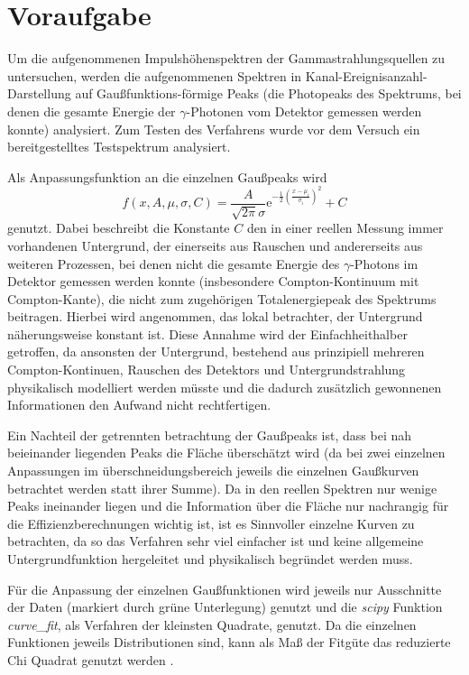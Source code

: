 \chapter{Voraufgabe}
Um die aufgenommenen Impulshöhenspektren der Gammastrahlungsquellen zu untersuchen, werden die aufgenommenen Spektren in Kanal-Ereignisanzahl-Darstellung auf Gaußfunktions-förmige Peaks (die Photopeaks des Spektrums, bei denen die gesamte Energie der $\gamma$-Photonen vom Detektor gemessen werden konnte) analysiert. Zum Testen des Verfahrens wurde vor dem Versuch ein bereitgestelltes Testspektrum analysiert.


Als Anpassungsfunktion an die einzelnen Gaußpeaks wird
\begin{equation}\label{eq:gaußpeak_const}
f(x,A,\mu,\sigma,C) = \frac{A}{\sqrt{2\pi}\sigma} \text{e}^{-\frac{1}{2}(\frac{x-\mu_i}{\sigma_i})^2}+C
\end{equation}
genutzt. Dabei beschreibt die Konstante $C$ den in einer reellen Messung immer vorhandenen Untergrund, der einerseits aus Rauschen und andererseits aus weiteren Prozessen, bei denen nicht die gesamte Energie des $\gamma$-Photons im Detektor gemessen werden konnte (insbesondere Compton-Kontinuum mit Compton-Kante), die nicht zum zugehörigen Totalenergiepeak des Spektrums beitragen. Hierbei wird angenommen, das lokal betrachter, der Untergrund näherungsweise konstant ist. Diese Annahme wird der Einfachheithalber getroffen, da ansonsten der Untergrund, bestehend aus prinzipiell mehreren Compton-Kontinuen, Rauschen des Detektors und Untergrundstrahlung physikalisch modelliert werden müsste und die dadurch zusätzlich gewonnenen Informationen den Aufwand nicht rechtfertigen.


Ein Nachteil der getrennten betrachtung der Gaußpeaks ist, dass bei nah beieinander liegenden Peaks die Fläche überschätzt wird (da bei zwei einzelnen Anpassungen im überschneidungsbereich jeweils die einzelnen Gaußkurven betrachtet werden statt ihrer Summe). Da in den reellen Spektren nur wenige Peaks ineinander liegen und die Information über die Fläche nur nachrangig für die Effizienzberechnungen wichtig ist, ist es Sinnvoller einzelne Kurven zu betrachten, da so das Verfahren sehr viel einfacher ist und keine allgemeine Untergrundfunktion hergeleitet und physikalisch begründet werden muss.


Für die Anpassung der einzelnen Gaußfunktionen wird jeweils nur Ausschnitte der Daten (markiert durch grüne Unterlegung) genutzt und die \textit{scipy} Funktion \textit{curve\_fit}, als Verfahren der kleinsten Quadrate, genutzt. Da die einzelnen Funktionen jeweils Distributionen sind, kann als Maß der Fitgüte das reduzierte Chi Quadrat genutzt werden \cite{chisquare}.

